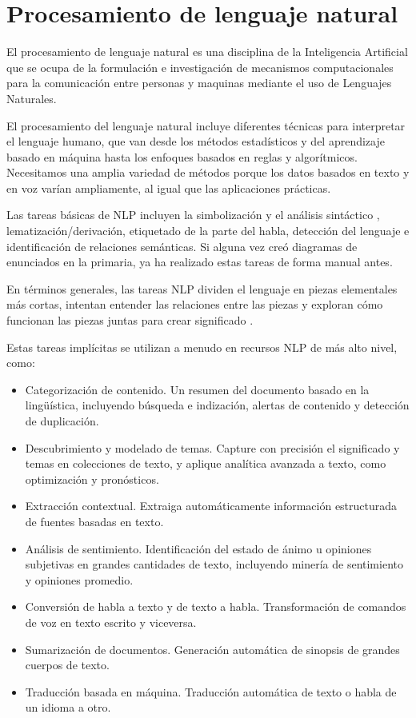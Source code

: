 \section{Procesamiento de lenguaje natural}
El procesamiento de lenguaje natural es una disciplina de la Inteligencia Artificial que se ocupa de la formulación e 
investigación de mecanismos computacionales para la comunicación entre personas y maquinas mediante el uso de Lenguajes 
Naturales.

El procesamiento del lenguaje natural incluye diferentes técnicas para interpretar el lenguaje humano, que van desde los métodos 
estadísticos y del aprendizaje basado en máquina hasta los enfoques basados en reglas y algorítmicos. Necesitamos una amplia variedad 
de métodos porque los datos basados en texto y en voz varían ampliamente, al igual que las aplicaciones prácticas. 

Las tareas básicas de NLP incluyen la simbolización y el análisis sintáctico , lematización/derivación, etiquetado de la parte del 
habla, detección del lenguaje e identificación de relaciones semánticas. Si alguna vez creó diagramas de enunciados en la primaria, 
ya ha realizado estas tareas de forma manual antes. 

En términos generales, las tareas NLP dividen el lenguaje en piezas elementales más cortas, intentan entender las relaciones entre 
las piezas y exploran cómo funcionan las piezas juntas para crear significado \citep{CT11}.

Estas tareas implícitas se utilizan a menudo en recursos NLP de más alto nivel, como:
\begin{itemize}
	\item Categorización de contenido. Un resumen del documento basado en la lingüística, 
	incluyendo búsqueda e indización, alertas de contenido y detección de duplicación.
	\item Descubrimiento y modelado de temas. Capture con precisión el significado y temas en colecciones de texto, y 
	aplique analítica avanzada a texto, como optimización y pronósticos.
	\item Extracción contextual. Extraiga automáticamente información estructurada de fuentes basadas en texto.
	\item Análisis de sentimiento. Identificación del estado de ánimo u opiniones subjetivas en grandes cantidades de 
	texto, incluyendo minería de sentimiento y opiniones promedio. 
	\item Conversión de habla a texto y de texto a habla. Transformación de comandos de voz en texto escrito y viceversa. 
	\item Sumarización de documentos. Generación automática de sinopsis de grandes cuerpos de texto.
	\item Traducción basada en máquina. Traducción automática de texto o habla de un idioma a otro.
\end{itemize}

